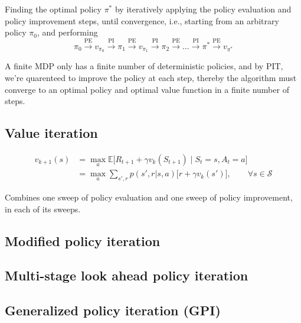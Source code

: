 Finding the optimal policy \( \pi^* \) by iteratively applying the policy evaluation and policy improvement steps, until convergence, i.e., starting from an arbitrary policy \( \pi_0 \), and performing
\begin{equation}
    \pi_0 \xrightarrow{\text{PE}} v_{\pi_0} \xrightarrow{\text{PI}} \pi_1 \xrightarrow{\text{PE}} v_{\pi_1} \xrightarrow{\text{PI}} \pi_2 \xrightarrow{\text{PE}} \dots \xrightarrow{\text{PI}} \pi^* \xrightarrow{\text{PE}} v_{\pi^*}
\end{equation}

A finite MDP only has a finite number of deterministic policies, and by PIT, we're quarenteed to improve the policy at each step, thereby the algorithm must converge to an optimal policy and optimal value function in a finite number of steps.

\subsection{Value iteration}

\begin{equation}
    \begin{aligned}
        v_{k+1}(s)
         & =
        \max_{a} \mathbb{E} \big[ R_{t+1} + \gamma v_k(S_{t+1}) \;\big|\; S_t = s, A_t = a \big]
        \\ & =
        \max_{a} \sum_{s', r} p(s', r | s, a) \Big[ r + \gamma v_k(s') \Big]
        , \qquad \forall s \in \mathcal{S}
    \end{aligned}
\end{equation}

Combines one sweep of policy evaluation and one sweep of policy improvement, in each of its sweeps.

\subsection{Modified policy iteration}

\subsection{Multi-stage look ahead policy iteration}

\subsection{Generalized policy iteration (GPI)}
